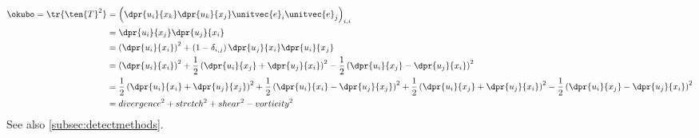 \begin{fullwidth}

\begin{derivationNobreak}\label{der:okubo}
\begin{equation}\begin{split}
\okubo=\tr{\ten{T}^2}
&=
\left(
\dpr{u_i}{x_k} \dpr{u_k}{x_j} \unitvec{e}_i \unitvec{e}_j
\right)_{i,i}\\
&=
\dpr{u_i}{x_j} \dpr{u_j}{x_i}\\
&=
\left(\dpr{u_i}{x_i}\right)^2
+\left(1-\delta_{i,j}\right)\dpr{u_j}{x_i} \dpr{u_i}{x_j} \\
&=
\left(\dpr{u_i}{x_i}\right)^2
+
\frac{1}{2}\left( \dpr{u_i}{x_j} + \dpr{u_j}{x_i} \right)^2
-\frac{1}{2}\left( \dpr{u_i}{x_j} - \dpr{u_j}{x_i} \right)^2 \\
&=
\frac{1}{2}\left( \dpr{u_i}{x_i} + \dpr{u_j}{x_j} \right)^2
+\frac{1}{2}\left( \dpr{u_i}{x_i} - \dpr{u_j}{x_j} \right)^2
+
\frac{1}{2}\left( \dpr{u_i}{x_j} + \dpr{u_j}{x_i} \right)^2
-\frac{1}{2}\left( \dpr{u_i}{x_j} - \dpr{u_j}{x_i} \right)^2 \\
&=
divergence^2
+ stretch^2
+ shear^2
- vorticity^2
\end{split}\end{equation}
See also \cref{subsec:detectmethods}.
\end{derivationNobreak}


\end{fullwidth}
